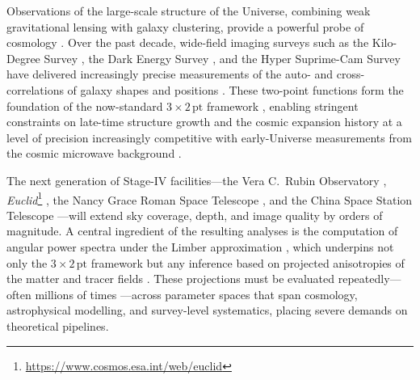 Observations of the large-scale structure of the Universe, combining weak gravitational lensing with galaxy clustering, provide a powerful probe of cosmology \citep{1972gcpa.book.....W, 1980lssu.book.....P, 1990ApJ...349L...1T, 1998ApJ...498...26K}. Over the past decade, wide-field imaging surveys such as the Kilo-Degree Survey \citep[KiDS;][]{2019A&A...625A...2K, 2024A&A...686A.170W}, the Dark Energy Survey \citep[DES;][]{2025MNRAS.543.4156Y, 2026ApJS..282...62B}, and the Hyper Suprime-Cam Survey \citep[HSC;][]{2022PASJ...74..247A, 2022PASJ...74..421L} have delivered increasingly precise measurements of the auto- and cross-correlations of galaxy shapes and positions \citep{2022PhRvD.105b3514A, 2022PhRvD.105b3515S, 2023PhRvD.108l3519D, 2023PhRvD.108l3518L, 2025A&A...702A.169S, 2025A&A...703A.158W, 2026arXiv260114559A, 2026arXiv260210065D}. These two-point functions form the foundation of the now-standard \(3 \times 2 \,\mathrm{pt}\) framework \citep{2021A&A...646A.140H, 2022PhRvD.105b3520A, 2023A&A...675A.189D, 2023PhRvD.108l3521S, 2023PhRvD.108l3517M}, enabling stringent constraints on late-time structure growth and the cosmic expansion history at a level of precision increasingly competitive with early-Universe measurements from the cosmic microwave background \citep[CMB;][]{2020A&A...641A...6P}.

The next generation of Stage-IV facilities---the Vera C.~Rubin Observatory \citep[\textit{Rubin}\footnote{\url{https://rubinobservatory.org}};][]{2009arXiv0912.0201L}, \textit{Euclid}\footnote{\url{https://www.cosmos.esa.int/web/euclid}} \citep{2025A&A...697A...1E}, the Nancy Grace Roman Space Telescope \citep[\textit{Roman}\footnote{\url{https://roman.gsfc.nasa.gov}};][]{2021MNRAS.507.1514E}, and the China Space Station Telescope \citep[CSST\footnote{\url{http://www.bao.ac.cn/csst/}};][]{2019ApJ...883..203G}---will extend sky coverage, depth, and image quality by orders of magnitude. A central ingredient of the resulting analyses is the computation of angular power spectra under the Limber approximation \citep{1953ApJ...117..134L, 2008PhRvD..78l3506L}, which underpins not only the \(3 \times 2 \,\mathrm{pt}\) framework but any inference based on projected anisotropies of the matter and tracer fields \citep{2018ARA&A..56..393M}. These projections must be evaluated repeatedly---often millions of times \citep[e.g.][]{2024OJAp....7E..73P}---across parameter spaces that span cosmology, astrophysical modelling, and survey-level systematics, placing severe demands on theoretical pipelines.

